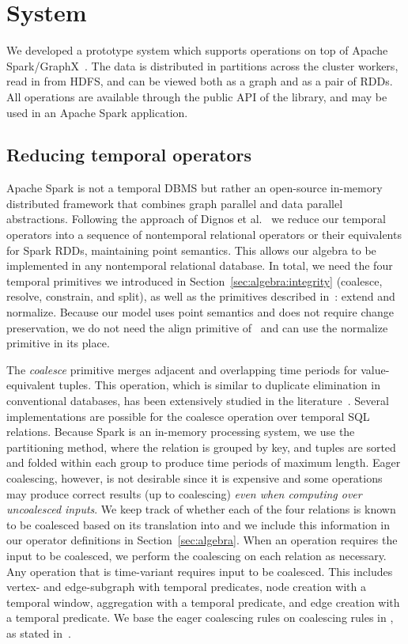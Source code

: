 \section{System}
\label{sec:sys}

We developed a prototype system \ql which supports \tga operations on
top of Apache Spark/GraphX~\cite{DBLP:conf/osdi/GonzalezXDCFS14}.  The
data is distributed in partitions across the cluster workers, read in
from HDFS, and can be viewed both as a graph and as a pair of RDDs.
All \tg operations are available through the public API of the \ql
library, and may be used in an Apache Spark application.

\subsection{Reducing temporal operators}

Apache Spark is not a temporal DBMS but rather an open-source
in-memory distributed framework that combines graph parallel and data
parallel abstractions.  Following the approach of Dignos et
al.~\cite{Dignos2012} we reduce our temporal operators into a sequence
of nontemporal relational operators or their equivalents for Spark
RDDs, maintaining point semantics.  This allows our algebra to be
implemented in any nontemporal relational database.  In total, we need
the four temporal primitives we introduced in
Section~\ref{sec:algebra:integrity} (coalesce, resolve, constrain, and
split), as well as the primitives described in~\cite{Dignos2012}:
extend and normalize.  Because our model uses point semantics and does
not require change preservation, we do not need the align primitive
of~\cite{Dignos2012} and can use the normalize primitive in its place.

The {\em coalesce} primitive merges adjacent and overlapping time
periods for value-equivalent tuples.  This operation, which is similar
to duplicate elimination in conventional databases, has been
extensively studied in the
literature~\cite{DBLP:conf/vldb/BohlenSS96,DBLP:journals/sigmod/Zimanyi06}.
Several implementations are possible for the coalesce operation over
temporal SQL relations.  Because Spark is an in-memory processing
system, we use the partitioning method, where the relation is grouped
by key, and tuples are sorted and folded within each group to produce
time periods of maximum length.  Eager coalescing, however, is not
desirable since it is expensive and some operations may produce
correct results (up to coalescing) {\em even when computing over
  uncoalesced inputs}.  We keep track of whether each of the four \tve
relations is known to be coalesced based on its translation into \tra
and we include this information in our operator definitions in
Section~\ref{sec:algebra}.  When an operation requires the input to be
coalesced, we perform the coalescing on each relation as necessary.
Any operation that is time-variant requires input to be coalesced.
This includes vertex- and edge-subgraph with temporal predicates, node
creation with a temporal window, aggregation with a temporal
predicate, and edge creation with a temporal predicate.  We base the
eager coalescing rules on coalescing rules in \tra, as stated
in~\cite{DBLP:conf/vldb/BohlenSS96}.  

